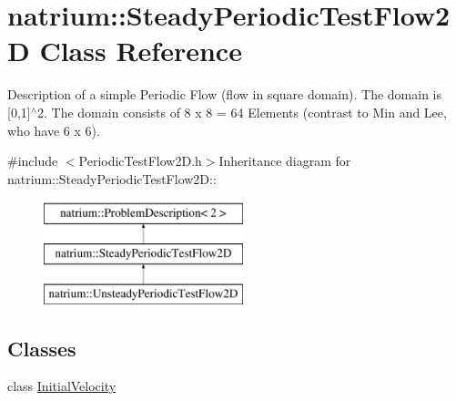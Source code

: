 \hypertarget{classnatrium_1_1SteadyPeriodicTestFlow2D}{
\section{natrium::SteadyPeriodicTestFlow2D Class Reference}
\label{classnatrium_1_1SteadyPeriodicTestFlow2D}
}


Description of a simple Periodic Flow (flow in square domain). The domain is \mbox{[}0,1\mbox{]}$^\wedge$2. The domain consists of 8 x 8 = 64 Elements (contrast to Min and Lee, who have 6 x 6).  


{\ttfamily \#include $<$PeriodicTestFlow2D.h$>$}Inheritance diagram for natrium::SteadyPeriodicTestFlow2D::\begin{figure}[H]
\begin{center}
\leavevmode
\includegraphics[height=3cm]{classnatrium_1_1SteadyPeriodicTestFlow2D}
\end{center}
\end{figure}
\subsection*{Classes}
\begin{DoxyCompactItemize}
\item 
class \hyperlink{classnatrium_1_1SteadyPeriodicTestFlow2D_1_1InitialVelocity}{InitialVelocity}
\end{DoxyCompactItemize}
